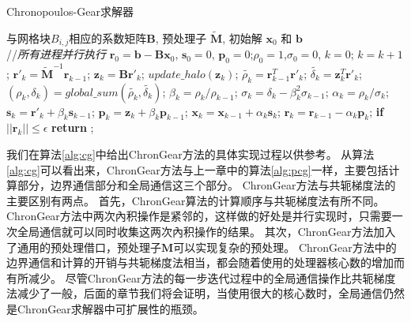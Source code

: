 \begin{algorithm}[!t]
\caption{Chronopoulos-Gear求解器}
\label{alg:cg}
\begin{algorithmic}[1]
\REQUIRE   与网格块$B_{i,j}$相应的系数矩阵$\textbf{B}$, 预处理子 $\tilde{\textbf{M}}$, 初始解 $\textbf{x}_0$ 和 $\textbf{b}$  \\
//\qquad    \textit{所有进程并行执行}
\STATE $\textbf{r}_0 = \textbf{b}-\textbf{B}\textbf{x}_0$, $\textbf{s}_0 =0$, $\textbf{p}_0 =0$;\quad $\rho_0=1$,$\sigma_0=0$, $k=0$;
\STATE $k=k+1$;
\STATE $\textbf{r}'_{k} =\tilde{\textbf{M}}^{-1}\textbf{r}_{k-1}$; \label{pcg_scale0} 
\STATE $\textbf{z}_k = \textbf{B}\textbf{r}'_{k}$; \label{pcg_mat}
\STATE $update\_halo(\textbf{z}_{k})$;  \label{pcg_bc1}
\STATE $\tilde{\rho_k} = \textbf{r}_{k-1}^T\textbf{r}'_{k}$;\label{pcg_dot1}
\STATE $\tilde{\delta_k} = \textbf{z}_k^T\textbf{r}'_k$;\label{pcg_dot2}
\STATE $(\rho_k,\delta_k) = global\_sum(\tilde{\rho_k},\tilde{\delta_k})$;\label{pcg_global1} 
\STATE $\beta_k = \rho_k / \rho_{k-1}$;\label{pcg_beta}
\STATE $\sigma_k = \delta_k - \beta_k^2\sigma_{k-1}$;\label{pcg_sigma}
\STATE $\alpha_k = \rho_k /\sigma_{k}$;\label{pcg_alpha}
\STATE $\textbf{s}_k = \textbf{r}'_{k} +\beta_k\textbf{s}_{k-1}$;\label{pcg_scale1}
\STATE $\textbf{p}_k = \textbf{z}_{k} +\beta_k\textbf{p}_{k-1}$;\label{pcg_scale2}
\STATE $\textbf{x}_k =\textbf{x}_{k-1} +\alpha_k \textbf{s}_k$;\label{pcg_scale3}
\STATE $\textbf{r}_k =\textbf{r}_{k-1} -\alpha_k\textbf{p}_k$;\label{pcg_scale4}
\STATE \textbf{if} $||\textbf{r}_k|| \le \epsilon$  \textbf{return} ;
\ENDIF
\ENDWHILE
\end{algorithmic}
\end{algorithm}

我们在算法\ref{alg:cg}中给出ChronGear方法的具体实现过程以供参考。
从算法\ref{alg:cg}可以看出来，ChronGear方法与上一章中的算法\ref{alg:pcg}一样，主要包括计算部分，边界通信部分和全局通信这三个部分。
ChronGear方法与共轭梯度法的主要区别有两点。
首先，ChronGear算法的计算顺序与共轭梯度法有所不同。
ChronGear方法中两次內积操作是紧邻的，这样做的好处是并行实现时，只需要一次全局通信就可以同时收集这两次內积操作的结果。
其次，ChronGear方法加入了通用的预处理借口，预处理子$\textbf{M}$可以实现复杂的预处理。 
ChronGear方法中的边界通信和计算的开销与共轭梯度法相当，都会随着使用的处理器核心数的增加而有所减少。 
尽管ChronGear方法的每一步迭代过程中的全局通信操作比共轭梯度法减少了一般，后面的章节我们将会证明，当使用很大的核心数时，全局通信仍然是ChronGear求解器中可扩展性的瓶颈。


